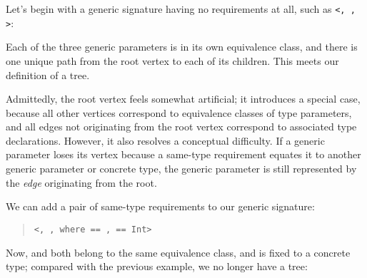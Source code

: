 \documentclass[../generics]{subfiles}
\begin{document}
\begin{example}
Let's begin with a generic signature having no requirements at all, such as \texttt{<, , >}:
\begin{quote}
\end{quote}
Each of the three generic parameters is in its own equivalence class, and there is one unique path from the root vertex to each of its children. This meets our definition of a tree.
\end{example}

Admittedly, the root vertex feels somewhat artificial; it introduces a special case, because all other vertices correspond to equivalence classes of type parameters, and all edges not originating from the root vertex correspond to associated type declarations. However, it also resolves a conceptual difficulty. If a generic parameter loses its vertex because a same-type requirement equates it to another generic parameter or concrete type, the generic parameter is still represented by the \emph{edge} originating from the root.

\begin{example} We can add a pair of same-type requirements to our generic signature:
\begin{quote}
\texttt{<, ,  where  == ,  == Int>}
\end{quote}
Now,  and  both belong to the same equivalence class, and  is fixed to a concrete type; compared with the previous example, we no longer have a tree:
\begin{quote}
\end{quote}
\end{example}
\end{document}
